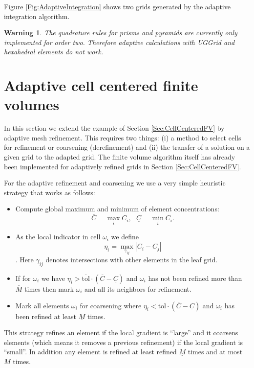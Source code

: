 \documentclass[11pt,a4paper,headinclude,footinclude,DIV16,normalheadings]{scrreprt}
\newtheorem{warn}[exc]{Warning}
\begin{document}
Figure \ref{Fig:AdaptiveIntegration} shows two grids generated by the
adaptive integration algorithm. 

\begin{warn} The quadrature rules for prisms and pyramids are
  currently only implemented for order two. Therefore adaptive
  calculations with UGGrid and hexahedral elements do not work.
\end{warn}



\section{Adaptive cell centered finite volumes}

In this section we extend the example of Section
\ref{Sec:CellCenteredFV} by adaptive mesh refinement. This requires
two things: (i) a method to select cells for refinement or coarsening
(derefinement) and (ii) the transfer of a solution on a given grid to
the adapted grid. The finite volume algorithm itself has already been
implemented for adaptively refined grids in Section
\ref{Sec:CellCenteredFV}.

For the adaptive refinement and coarsening we use a very simple
heuristic strategy that works as follows:
\begin{itemize}
\item Compute global maximum and minimum of element concentrations:
  $$\overline{C}=\max_i C_i,  \ \ \ \underline{C}=\min_i C_i.$$
\item As the local indicator in cell $\omega_i$ we define $$\eta_i =
  \max_{\gamma_{ij}} |C_i-C_j|$$. Here $\gamma_{ij}$ denotes
  intersections with other elements in the leaf grid.
\item If for $\omega_i$ we have
  $\eta_i>\overline{\text{tol}}\cdot (\overline{C}-\underline{C})$
  and $\omega_i$ has not been refined more than $\overline{M}$ times
  then mark $\omega_i$ and all its neighbors for refinement.
\item Mark all elements $\omega_i$ for coarsening where
  $\eta_i<\underline{\text{tol}}\cdot (\overline{C}-\underline{C})$
  and $\omega_i$ has been refined at least $\underline{M}$ times.
\end{itemize}

This strategy refines an element if the local gradient is ``large''
and it coarsens elements (which means it removes a previous
refinement) if the local gradient is ``small''. In addition any
element is refined at least refined $\underline{M}$ times and at most
$\overline{M}$ times.
\end{document}
